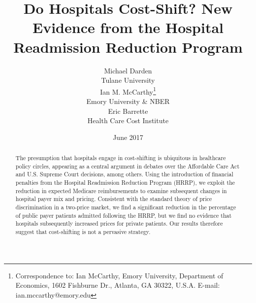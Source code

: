 \documentclass[12pt]{article}
\begin{document}
\title{Do Hospitals Cost-Shift? New Evidence from the Hospital Readmission Reduction Program}
\author{%
  Michael Darden \\[-1.5ex]
  Tulane University \\
  Ian M. McCarthy\thanks{Correspondence to: Ian McCarthy, Emory University, Department of Economics, 1602 Fishburne Dr., Atlanta, GA 30322, U.S.A. E-mail: ian.mccarthy@emory.edu} \\[-1.5ex]
  Emory University \& NBER \\
  Eric Barrette \\[-1.5ex]
  Health Care Cost Institute
}
\date{June 2017}

\maketitle

\begin{abstract}
The presumption that hospitals engage in cost-shifting is ubiquitous in healthcare policy circles, appearing as a central argument in debates over the Affordable Care Act and U.S. Supreme Court decisions, among others. Using the introduction of financial penalties from the Hospital Readmission Reduction Program (HRRP), we exploit the reduction in expected Medicare reimbursements to examine subsequent changes in hospital payer mix and pricing. Consistent with the standard theory of price discrimination in a two-price market, we find a significant reduction in the percentage of public payer patients admitted following the HRRP, but we find no evidence that hospitals subsequently increased prices for private patients. Our results therefore suggest that cost-shifting is not a pervasive strategy.
\end{abstract}

\vspace{-2ex}

\begin{comment}
Notes from calls:
-- Big changes across hospitals and time, not just one big change across all hospitals
-- Zack Cooper HCCI pricing paper (how to control for insurance HHI)
-- Split sample by profit status, pre-HRRP medicare mix. Maybe more/less competitive insurance/hospital markets?
-- How to incorporate relative market share? This could be third difference (instead of monopoly, duopoly, etc.), or just concentration in insurance industry?
\end{comment}
\end{document}
